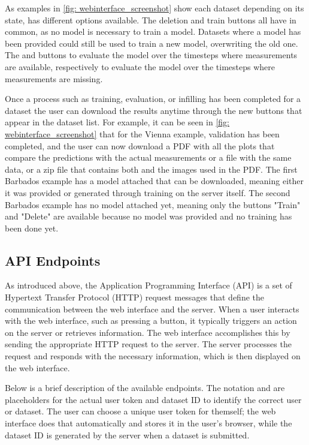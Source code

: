 As examples in \autoref{fig: webinterface_screenshot} show each dataset depending on its state, has different options available.
The deletion and train buttons all have in common, as no model is necessary to train a model.
Datasets where a model has been provided could still be used to train a new model, overwriting the old one.
The  and  buttons to evaluate the model over the timesteps where measurements are available, respectively to evaluate the model over the timesteps where measurements are missing.

Once a process such as training, evaluation, or infilling has been completed for a dataset the user can download the results anytime through the new buttons that appear in the dataset list.
For example, it can be seen in \autoref{fig: webinterface_screenshot} that for the Vienna example, validation has been completed, and the user can now download a PDF with all the plots that compare the predictions with the actual measurements or a  file with the same data, or a zip file that contains both and the images used in the PDF.
The first Barbados example has a model attached that can be downloaded, meaning either it was provided or generated through training on the server itself.
The second Barbados example has no model attached yet, meaning only the buttons "Train" and "Delete" are available because no model was provided and no training has been done yet.

\subsection{API Endpoints}
\label{sec: api}

As introduced above, the Application Programming Interface (API) is a set of Hypertext Transfer Protocol (HTTP) request messages that define the communication between the web interface and the server.
When a user interacts with the web interface, such as pressing a button, it typically triggers an action on the server or retrieves information. The web interface accomplishes this by sending the appropriate HTTP request to the server. The server processes the request and responds with the necessary information, which is then displayed on the web interface.

Below is a brief description of the available endpoints. The notation  and  are placeholders for the actual user token and dataset ID to identify the correct user or dataset. The user can choose a unique user token for themself; the web interface does that automatically and stores it in the user's browser, while the dataset ID is generated by the server when a dataset is submitted.

